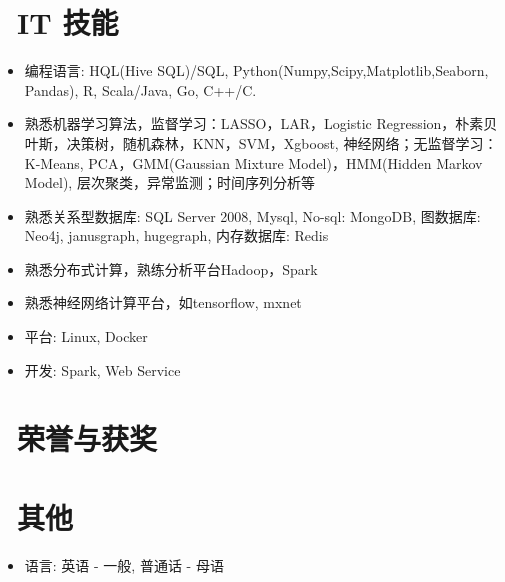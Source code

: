 \documentclass{resume}
\begin{document}
\section{\faCogs\ IT 技能}
\begin{itemize}[parsep=0.5ex]
  \item 编程语言: HQL(Hive SQL)/SQL, Python(Numpy,Scipy,Matplotlib,Seaborn, Pandas), R, Scala/Java, Go, C++/C.
  \item 熟悉机器学习算法，监督学习：LASSO，LAR，Logistic Regression，朴素贝叶斯，决策树，随机森林，KNN，SVM，Xgboost, 神经网络；无监督学习：K-Means, PCA，GMM(Gaussian Mixture Model)，HMM(Hidden Markov Model), 层次聚类，异常监测；时间序列分析等
  \item 熟悉关系型数据库: SQL Server 2008, Mysql, No-sql: MongoDB, 图数据库: Neo4j, janusgraph, hugegraph, 内存数据库: Redis	  
  \item 熟悉分布式计算，熟练分析平台Hadoop，Spark
  \item 熟悉神经网络计算平台，如tensorflow, mxnet	  
  \item 平台: Linux, Docker
  \item 开发: Spark, Web Service
\end{itemize}

\section{\faHeartO\ 荣誉与获奖}
\section{\faInfo\ 其他}
\begin{itemize}[parsep=0.5ex]
  \item 语言: 英语 - 一般, 普通话 - 母语
\end{itemize}

%
%
\end{document}
